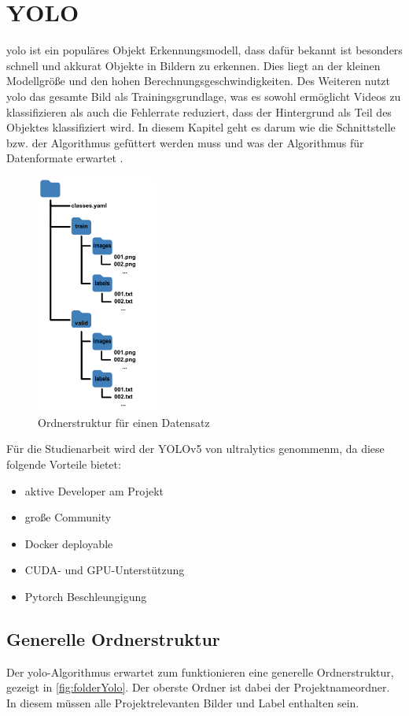 \chapter{YOLO}
\label{sec:yolo}
\ac{yolo} ist ein populäres Objekt Erkennungsmodell, dass dafür bekannt ist besonders schnell und akkurat Objekte in Bildern zu erkennen. Dies liegt an der kleinen Modellgröße und den hohen Berechnungsgeschwindigkeiten. Des Weiteren nutzt \ac{yolo} das gesamte Bild als Trainingsgrundlage, was es sowohl ermöglicht Videos zu klassifizieren als auch die Fehlerrate reduziert, dass der Hintergrund als Teil des Objektes klassifiziert wird. In diesem Kapitel geht es darum wie die Schnittstelle bzw. der Algorithmus gefüttert werden muss und was der Algorithmus für Datenformate erwartet \cite{Jiang.2022}.

\begin{figure}
    \includegraphics[width=4cm]{data/img/ordnerstruktur_yolo.png}
    \caption{Ordnerstruktur für einen Datensatz}
    \label{fig:folderYolo}
\end{figure}

Für die Studienarbeit wird der YOLOv5 von ultralytics \cite{glennjocher.2023} genommenm, da diese folgende Vorteile bietet:
\begin{itemize}
    \item aktive Developer am Projekt
    \item große Community 
    \item Docker deployable
    \item CUDA- und GPU-Unterstützung
    \item Pytorch Beschleungigung
\end{itemize}


\section{Generelle Ordnerstruktur}
Der \ac{yolo}-Algorithmus erwartet zum funktionieren eine generelle Ordnerstruktur, gezeigt in \autoref{fig:folderYolo}. Der oberste Ordner ist dabei der Projektnameordner. In diesem müssen alle Projektrelevanten Bilder und Label enthalten sein. 

